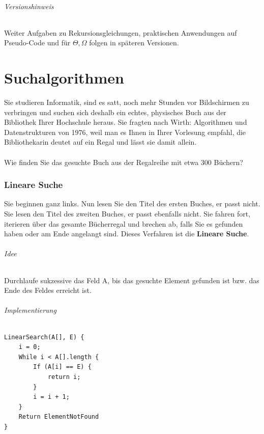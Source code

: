 \documentclass[11pt,a4paper]{scrartcl}
\begin{document}
\paragraph{Versionshinweis} Weiter Aufgaben zu Rekursionsgleichungen, praktischen Anwendungen auf Pseudo-Code und für $\Theta , \Omega$ folgen in späteren Versionen.
\pagebreak
\part{Suchalgorithmen}
Sie studieren Informatik, sind es satt, noch mehr Stunden vor Bildschirmen zu verbringen und suchen sich deshalb ein echtes, physisches Buch aus der Bibliothek Ihrer Hochschule heraus. Sie fragten nach {\glqq} Wirth: Algorithmen und Datenstrukturen{\grqq} von 1976, weil man es Ihnen in Ihrer Vorlesung empfahl, die Bibliothekarin deutet auf ein Regal und lässt sie damit allein. \\\\
Wie finden Sie das gesuchte Buch aus der Regalreihe mit etwa 300 Büchern?
\section{Lineare Suche}
Sie beginnen ganz links. Nun lesen Sie den Titel des ersten Buches, er passt nicht. Sie lesen den Titel des zweiten Buches, er passt ebenfalls nicht. Sie fahren fort, iterieren über das gesamte Bücherregal und brechen ab, falls Sie es gefunden haben oder am Ende angelangt sind. Dieses Verfahren ist die \textbf{Lineare Suche}.
\paragraph{Idee}
Durchlaufe sukzessive das Feld A, bis das gesuchte Element gefunden ist bzw. das Ende des Feldes erreicht ist.
\paragraph{Implementierung}
\begin{lstlisting}
LinearSearch(A[], E) {
	i = 0;
	While i < A[].length {
		If (A[i] == E) {
			return i;			
		}
		i = i + 1;	
	}
	Return ElementNotFound
}
\end{lstlisting}
\end{document}
